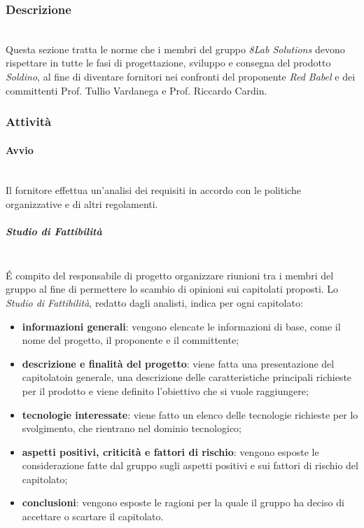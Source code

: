 	\subsubsection{Descrizione} \mbox{}\\ 
		\noindent Questa sezione tratta le norme che i membri del gruppo \textit{8Lab Solutions} 
		devono rispettare in tutte le fasi di progettazione, sviluppo e consegna del 
		prodotto \textit{Soldino}, al fine di diventare fornitori nei confronti del 
		proponente \textit{Red Babel} e dei committenti Prof. Tullio Vardanega e Prof. 
		Riccardo Cardin.

	\subsubsection{Attività}
		\paragraph{Avvio} \mbox{}\\
		Il fornitore effettua un'analisi dei requisiti in accordo con le politiche 
		organizzative e di altri regolamenti.
			\subparagraph{Studio di Fattibilità} \mbox{}\\ 

			\noindent \'E compito del responsabile di progetto organizzare riunioni tra i membri del 
			gruppo al fine di permettere lo scambio di opinioni sui capitolati proposti.
			Lo \textit{Studio di Fattibilità}, redatto dagli analisti, indica per ogni 
			capitolato\glo:
				\begin{itemize}
					\item \textbf{informazioni generali}: vengono elencate le informazioni di 
						base, come il nome del progetto, il proponente e il committente;
					\item \textbf{descrizione e finalità del progetto}: viene fatta una 
						presentazione del capitolato\glosp in generale, una descrizione delle 
						caratteristiche principali richieste per il prodotto e viene definito 
						l'obiettivo che si vuole raggiungere;
					\item \textbf{tecnologie interessate}: viene fatto un elenco delle tecnologie 
						richieste per lo svolgimento, che rientrano nel dominio tecnologico;
					\item \textbf{aspetti positivi, criticità e fattori di rischio}: vengono 
						esposte le considerazione fatte dal gruppo sugli aspetti positivi e sui fattori 
						di rischio del capitolato\glo;
					\item \textbf{conclusioni}: vengono esposte le ragioni per la quale il gruppo 
						ha deciso di accettare o scartare il capitolato\glo.
				\end{itemize}
